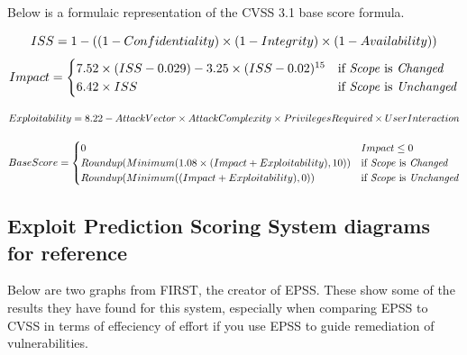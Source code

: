 \documentclass[12pt]{article}
\begin{document}
Below is a formulaic representation of the CVSS 3.1 base score formula.
	{\scriptsize
		\begin{equation}
			ISS = 1 - ((1 - Confidentiality) \times (1 - Integrity) \times (1 - Availability)) \\
		\end{equation}
		\begin{equation}
			Impact =
			\begin{cases}
				7.52 \times (ISS - 0.029) - 3.25 \times (ISS - 0.02)^{15} & \text{if \textit{Scope} is
				\textit{Changed}}                                                                      \\
				6.42 \times ISS                                           & \text{if \textit{Scope} is
					\textit{Unchanged}}
			\end{cases}
		\end{equation}

		\begin{equation}
			Exploitability = 8.22 - AttackVector \times AttackComplexity \times PrivilegesRequired \times
			UserInteraction \\
		\end{equation}

		\begin{equation}
			Base Score =
			\begin{cases}
				0                                                           & Impact \leq 0              \\
				Roundup(Minimum(1.08 \times (Impact + Exploitability), 10)) & \text{if \textit{Scope} is
				\textit{Changed}}                                                                        \\
				Roundup(Minimum((Impact + Exploitability), 0))              & \text{if \textit{Scope} is
				\textit{Unchanged}}                                                                      \\
			\end{cases}
		\end{equation}
	}

\subsection{Exploit Prediction Scoring System diagrams for reference}

Below are two graphs from FIRST, the creator of EPSS. These show some of the results they have
found for this system, especially when comparing EPSS to CVSS in terms of effeciency of effort if
you use EPSS to guide remediation of vulnerabilities.
\end{document}
